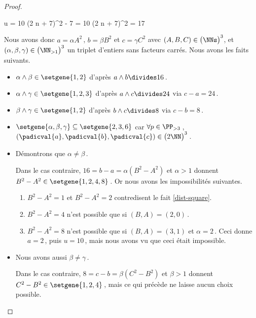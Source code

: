 \begin{proof}
\begin{itemize}
		\medskip
		\noindent\!\!%
   		\begin{stepcalc}[style = sar, ope = \iff]
			u = 10
		\explnext{}
			(2 n + 7)^2 - 7 = 10
		\explnext*{$17 \notin \NNsquare$}{}
			(2 n + 7)^2 = 17
		\end{stepcalc}
	\end{itemize}


	Nous avons donc $a = \alpha A^2$\,, $b = \beta B^2$ et $c = \gamma C^2$ avec $(A, B, C) \in \big( \NNs \big)^3$, et $(\alpha, \beta, \gamma) \in \big( \NN_{>1} \big)^3$ un triplet d'entiers sans facteurs carrés.
	Nous avons les faits suivants.
    
    \begin{itemize}
		\item $\alpha \wedge \beta \in \setgene{1, 2}$
		d'après $a \wedge b \divides 16$\,.

		\item $\alpha \wedge \gamma \in \setgene{1, 2, 3}$
		d'après $a \wedge c \divides 24$ via $c - a = 24$\,.

		\item $\beta \wedge \gamma \in \setgene{1, 2}$
		d'après $b \wedge c \divides 8$  via $c - b = 8$\,.

		\item $\setgene{\alpha, \beta, \gamma} \subseteq \setgene{2, 3, 6}$
		car $\forall p \in \PP_{>3}$\,, $(\padicval{a}, \padicval{b}, \padicval{c}) \in \big( 2 \NN \big)^3$\,. 
		

		\item Démontrons que $\alpha \neq \beta$\,. 
		
		\noindent
		Dans le cas contraire, $16 = b - a = \alpha(B^2 - A^2)$ et $\alpha > 1$ donnent $B^2 - A^2 \in \setgene{1, 2, 4, 8}$\,.
		Or nous avons les impossibilités suivantes.
		\begin{enumerate}
			\item $B^2 - A^2 = 1$  et $B^2 - A^2 = 2$ contredisent le fait \ref{dist-square}.
			\item $B^2 - A^2 = 4$ n'est possible que si $(B, A) = (2, 0)$\,.
			\item $B^2 - A^2 = 8$ n'est possible que si $(B, A) = (3, 1)$ et $\alpha = 2$\,.
			Ceci donne $a = 2$\,, puis $u = 10$\,, mais nous avons vu que ceci était impossible.
		\end{enumerate}
		

		\item Nous avons aussi $\beta \neq \gamma$\,. 
		
		\noindent
		Dans le cas contraire, $8 = c - b = \beta(C^2 - B^2)$ et $\beta > 1$ donnent $C^2 - B^2 \in \setgene{1, 2, 4}$\,, mais ce qui précède ne laisse aucun choix possible.
		


\end{itemize}
\end{proof}
